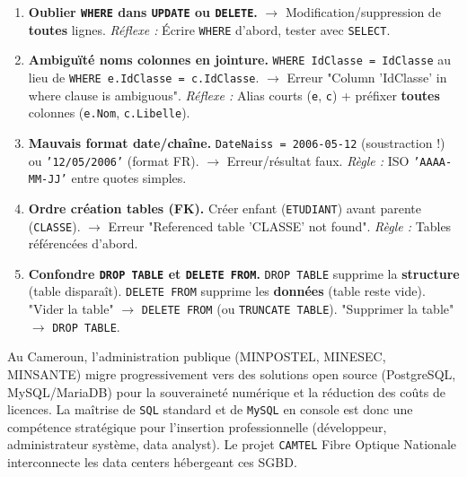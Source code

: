 \documentclass[11pt]{article}
\begin{document}
\begin{attention}
\begin{enumerate}
    \item \textbf{Oublier \texttt{WHERE} dans \texttt{UPDATE} ou \texttt{DELETE}.} $\rightarrow$ Modification/suppression de \textbf{toutes} lignes. \emph{Réflexe :} Écrire \texttt{WHERE} d'abord, tester avec \texttt{SELECT}.
    \item \textbf{Ambiguïté noms colonnes en jointure.} \texttt{WHERE IdClasse = IdClasse} au lieu de \texttt{WHERE e.IdClasse = c.IdClasse}. $\rightarrow$ Erreur "Column 'IdClasse' in where clause is ambiguous". \emph{Réflexe :} Alias courts (\texttt{e}, \texttt{c}) + préfixer \textbf{toutes} colonnes (\texttt{e.Nom}, \texttt{c.Libelle}).
    \item \textbf{Mauvais format date/chaîne.} \texttt{DateNaiss = 2006-05-12} (soustraction !) ou \texttt{'12/05/2006'} (format FR). $\rightarrow$ Erreur/résultat faux. \emph{Règle :} ISO \texttt{'AAAA-MM-JJ'} entre quotes simples.
    \item \textbf{Ordre création tables (FK).} Créer enfant (\texttt{ETUDIANT}) avant parente (\texttt{CLASSE}). $\rightarrow$ Erreur "Referenced table 'CLASSE' not found". \emph{Règle :} Tables référencées d'abord.
    \item \textbf{Confondre \texttt{DROP TABLE} et \texttt{DELETE FROM}.} \texttt{DROP TABLE} supprime la \textbf{structure} (table disparaît). \texttt{DELETE FROM} supprime les \textbf{données} (table reste vide). "Vider la table" $\rightarrow$ \texttt{DELETE FROM} (ou \texttt{TRUNCATE TABLE}). "Supprimer la table" $\rightarrow$ \texttt{DROP TABLE}.
\end{enumerate}
\end{attention}

\begin{savaistu}
Au Cameroun, l'administration publique (MINPOSTEL, MINESEC, MINSANTE) migre progressivement vers des solutions open source (PostgreSQL, MySQL/MariaDB) pour la souveraineté numérique et la réduction des coûts de licences. La maîtrise de \texttt{SQL} standard et de \texttt{MySQL} en console est donc une compétence stratégique pour l'insertion professionnelle (développeur, administrateur système, data analyst). Le projet \texttt{CAMTEL} Fibre Optique Nationale interconnecte les data centers hébergeant ces SGBD.
\end{savaistu}

\newpage
\end{document}
